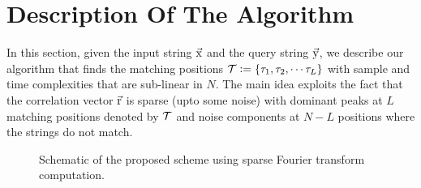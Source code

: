 \section{Description Of The Algorithm}
\label{sec:Algo_desc}
In this section, given the input string $\vec{\mathrm{x}}$ and the query string $\vec{\mathrm{y}}$, we describe our algorithm that finds the matching positions $\mathcal{T}\mathrel{\mathop:}= \{\tau_1, \tau_2, \cdots \tau_L\}$ with sample and time complexities that are sub-linear in $N$. The main idea exploits the fact that the correlation vector $\vec{\mathrm{r}}$ is sparse (upto some noise) with dominant peaks at $L$ matching positions denoted by $\mathcal{T}$ and noise components at $N-L$ positions where the strings do not match.


\begin{figure*}
  \centering
	 	\resizebox{0.95\textwidth}{!}{}	
	\caption{Schematic of the proposed scheme using sparse Fourier transform computation.}\label{fig:notional}
\end{figure*}




